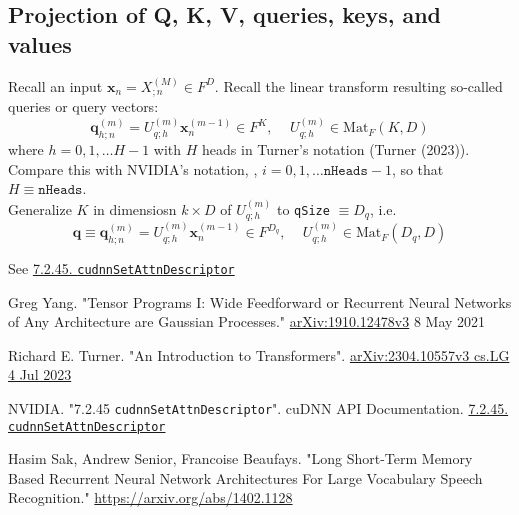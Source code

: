 \documentclass[10pt]{amsart}
\begin{document}
\begin{multicols*}{2}
\subsection{Projection of Q, K, V, queries, keys, and values}

Recall an input $\mathbf{x}_n = X^{(M)}_{;n} \in F^D$. Recall the linear transform resulting so-called queries or query vectors:
\[
\mathbf{q}^{(m)}_{h; n} = U^{(m)}_{q;h} \mathbf{x}^{(m-1)}_n \in F^K, \quad \, U^{(m)}_{q; h} \in \text{Mat}_F(K, D)
\]
where $h=0,1,\dots H-1$ with $H$ heads in Turner's notation (Turner (2023)\cite{Turn2023}). Compare this with NVIDIA's notation, \cite{NSAtn2023}, $i=0,1,\dots \texttt{nHeads} - 1$, so that $H \equiv \texttt{nHeads}$.\\

Generalize $K$ in dimensiosn $k\times D$ of $U^{(m)}_{q;h}$ to \texttt{qSize} $\equiv D_q$, i.e.
\[
\mathbf{q} \equiv \mathbf{q}^{(m)}_{h ; n} = U^{(m)}_{q;h} \mathbf{x}_n^{(m-1)} \in F^{D_q}, \quad \,  U^{(m)}_{q;h} \in \text{Mat}_F(D_q, D)
\] 

See \href{https://docs.nvidia.com/deeplearning/cudnn/api/index.html#cudnnSetAttnDescriptor}{7.2.45. \texttt{cudnnSetAttnDescriptor}}

\end{multicols*}

\begin{thebibliography}{9}

Greg Yang. "Tensor Programs I: Wide Feedforward or Recurrent Neural Networks of Any Architecture are Gaussian Processes." \href{https://arxiv.org/pdf/1910.12478.pdf}{arXiv:1910.12478v3} 8 May 2021

Richard E. Turner. "An Introduction to Transformers". \href{https://arxiv.org/pdf/2304.10557.pdf}{arXiv:2304.10557v3 cs.LG 4 Jul 2023}

NVIDIA. "7.2.45 \texttt{cudnnSetAttnDescriptor}". cuDNN API Documentation. \href{https://docs.nvidia.com/deeplearning/cudnn/api/index.html#cudnnSetAttnDescriptor}{7.2.45. \texttt{cudnnSetAttnDescriptor}}

Hasim Sak, Andrew Senior, Francoise Beaufays. "Long Short-Term Memory Based Recurrent Neural Network Architectures For Large Vocabulary Speech Recognition." \url{https://arxiv.org/abs/1402.1128}

\end{thebibliography}
\end{document}
